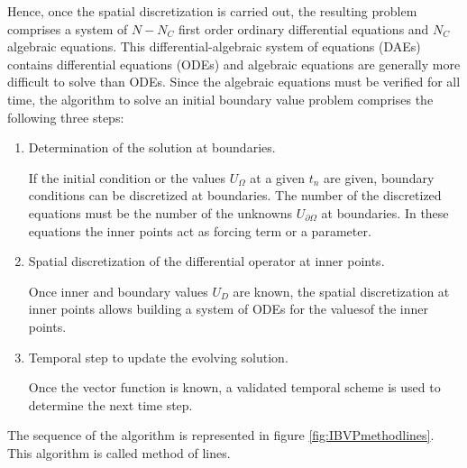 Hence, once the spatial discretization is carried out, the resulting problem comprises a system of $ N-N_C$ first order ordinary differential equations and $ N_C $ algebraic equations. 
This  differential-algebraic system of equations (DAEs)  contains differential equations (ODEs) and algebraic equations are generally more difficult to solve than ODEs. Since the algebraic equations must be verified for all time, the algorithm to solve an initial boundary value problem 
comprises the following three steps: 
\begin{enumerate} 
\item Determination of the solution at boundaries.

      If the initial condition or the values $ U_{\Omega} $ at a given $ t_n $ are given, boundary conditions can be discretized  at 
      boundaries. The number of the discretized equations must be the number of the unknowns $ U_{\partial \Omega} $ at boundaries. In these equations the inner points act as  forcing term or a parameter. 

\item Spatial discretization of the differential operator at inner points.

      Once inner and boundary values $ U_{D} $  are known, the spatial discretization at inner points allows building a system of ODEs for the valuesof the inner points.  

  
\item Temporal step to update the evolving solution. 
       
       Once the vector function is known, a validated temporal scheme is used to determine the next time step.  

\end{enumerate}  

The sequence of the algorithm is represented in figure 	\ref{fig:IBVPmethodlines}. This algorithm is called method of lines. 
       
       \IBVPmethodlines
       
       \FloatBarrier
 
 
 
 
 
 
 
 
 
 
  
 \newpage         
